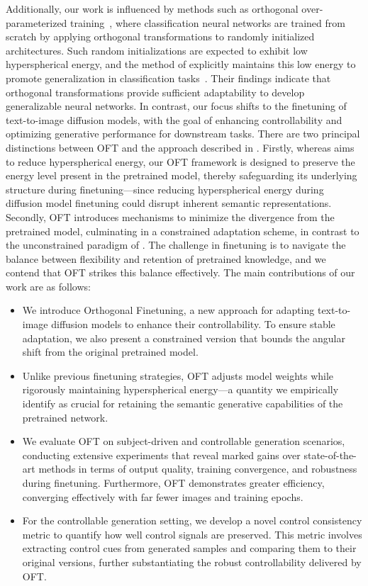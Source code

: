 Additionally, our work is influenced by methods such as orthogonal over-parameterized training~\cite{liu2021orthogonal}, where classification neural networks are trained from scratch by applying orthogonal transformations to randomly initialized architectures. Such random initializations are expected to exhibit low hyperspherical energy, and the method of \cite{liu2021orthogonal} explicitly maintains this low energy to promote generalization in classification tasks~\cite{liu2018learning,lin2020regularizing}. Their findings indicate that orthogonal transformations provide sufficient adaptability to develop generalizable neural networks. In contrast, our focus shifts to the finetuning of text-to-image diffusion models, with the goal of enhancing controllability and optimizing generative performance for downstream tasks. There are two principal distinctions between OFT and the approach described in \cite{liu2021orthogonal}. Firstly, whereas \cite{liu2021orthogonal} aims to reduce hyperspherical energy, our OFT framework is designed to preserve the energy level present in the pretrained model, thereby safeguarding its underlying structure during finetuning—since reducing hyperspherical energy during diffusion model finetuning could disrupt inherent semantic representations. Secondly, OFT introduces mechanisms to minimize the divergence from the pretrained model, culminating in a constrained adaptation scheme, in contrast to the unconstrained paradigm of \cite{liu2021orthogonal}. The challenge in finetuning is to navigate the balance between flexibility and retention of pretrained knowledge, and we contend that OFT strikes this balance effectively. The main contributions of our work are as follows:

\begin{itemize}[leftmargin=*,nosep]

    \item We introduce Orthogonal Finetuning, a new approach for adapting text-to-image diffusion models to enhance their controllability. To ensure stable adaptation, we also present a constrained version that bounds the angular shift from the original pretrained model.
    \item Unlike previous finetuning strategies, OFT adjusts model weights while rigorously maintaining hyperspherical energy—a quantity we empirically identify as crucial for retaining the semantic generative capabilities of the pretrained network.
    \item We evaluate OFT on subject-driven and controllable generation scenarios, conducting extensive experiments that reveal marked gains over state-of-the-art methods in terms of output quality, training convergence, and robustness during finetuning. Furthermore, OFT demonstrates greater efficiency, converging effectively with far fewer images and training epochs.
    \item For the controllable generation setting, we develop a novel control consistency metric to quantify how well control signals are preserved. This metric involves extracting control cues from generated samples and comparing them to their original versions, further substantiating the robust controllability delivered by OFT.
\end{itemize}

